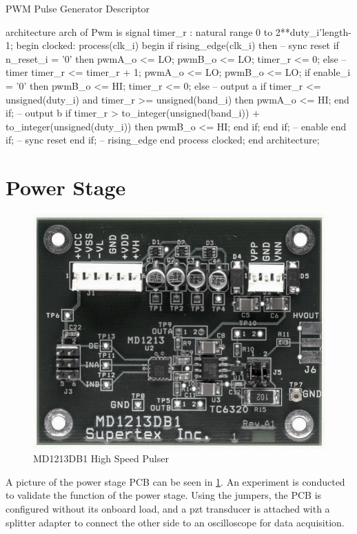 \begin{listing}[htbp]
	\caption{PWM Pulse Generator Descriptor}
	\label{lst:4_controlsystem_pulser}
	\begin{mintedvhdl}
architecture arch of Pwm is
	signal timer_r       : natural range 0 to 2**duty_i'length-1;
	begin
		clocked: process(clk_i)
		begin
			if rising_edge(clk_i) then
			-- sync reset
			if n_reset_i = '0' then
				pwmA_o   <= LO;
				pwmB_o   <= LO;
				timer_r <= 0;
			else
			-- timer
				timer_r <= timer_r + 1;
				pwmA_o   <= LO;
				pwmB_o   <= LO;
				if enable_i = '0' then
					pwmB_o   <= HI;
					timer_r <= 0;
				else
					-- output a
					if timer_r <= unsigned(duty_i) and timer_r >= unsigned(band_i)  then
						pwmA_o <= HI;
					end if;
					-- output b
					if timer_r > to_integer(unsigned(band_i)) + to_integer(unsigned(duty_i)) then
						pwmB_o <= HI;
					end if;
				end if; -- enable
			end if; -- sync reset
		end if; -- rising_edge
	end process clocked;
end architecture;
	\end{mintedvhdl}
\end{listing}

\section{Power Stage}
\begin{figure}[htbp]
	\centering
	\includegraphics[width=.8\textwidth]{Figures/4_transmitter_pcb_pic.jpg}
	\caption{MD1213DB1 High Speed Pulser}
	\label{fig:4_transmitter_pcb_pic}
\end{figure}
A picture of the power stage PCB can be seen in \cref{fig:4_transmitter_pcb_pic}. An experiment is conducted to validate the function of the power stage. Using the jumpers, the PCB is configured without its onboard load, and a \gls{pzt} transducer is attached with a splitter adapter to connect the other side to an oscilloscope for data acquisition.

